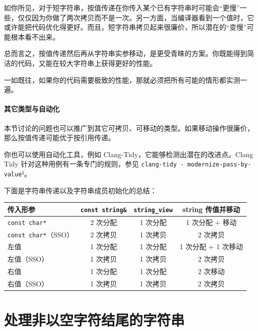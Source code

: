 如你所见，对于短字符串，按值传递在你传入某个已有字符串时可能会“更慢”一些，仅仅因为你做了两次拷贝而不是一次。另一方面，当编译器看到一个值时，它或许能把代码优化得更好。而且，短字符串拷贝起来很廉价，所以潜在的“变慢”可能根本看不出来。

总而言之，按值传递然后再从字符串实参移动，是更受青睐的方案。你既能得到简洁的代码，又能在较大字符串上获得更好的性能。

一如既往，如果你的代码需要极致的性能，那就必须把所有可能的情形都实测一遍。

\paragraph{其它类型与自动化}

本节讨论的问题也可以推广到其它可拷贝、可移动的类型。如果移动操作很廉价，那么按值传递可能优于按引用传递。

你也可以使用自动化工具，例如 Clang-Tidy，它能够检测出潜在的改进点。Clang Tidy 针对这种用例有一条专门的规则，参见 \texttt{clang-tidy - modernize-pass-by-value}⁵。



下面是字符串传递以及字符串成员初始化的总结：

\begin{table}[H]
\centering
\begin{tabularx}{\textwidth}{X c c c}
\toprule
传入形参 & \texttt{const string\&} & \texttt{string\_view} & string 传值并移动 \\
\midrule
\texttt{const char*} & 2 次分配 & 1 次分配 & 1 次分配 + 移动 \\
\texttt{const char*}（SSO） & 2 次拷贝 & 1 次拷贝 & 2 次拷贝 \\
左值 & 1 次分配 & 1 次分配 & 1 次分配 + 1 次移动 \\
左值（SSO） & 1 次拷贝 & 1 次拷贝 & 2 次拷贝 \\
右值 & 1 次分配 & 1 次分配 & 2 次移动 \\
右值（SSO） & 1 次拷贝 & 1 次拷贝 & 2 次拷贝 \\
\bottomrule
\end{tabularx}
\end{table}

\section{处理非以空字符结尾的字符串}

